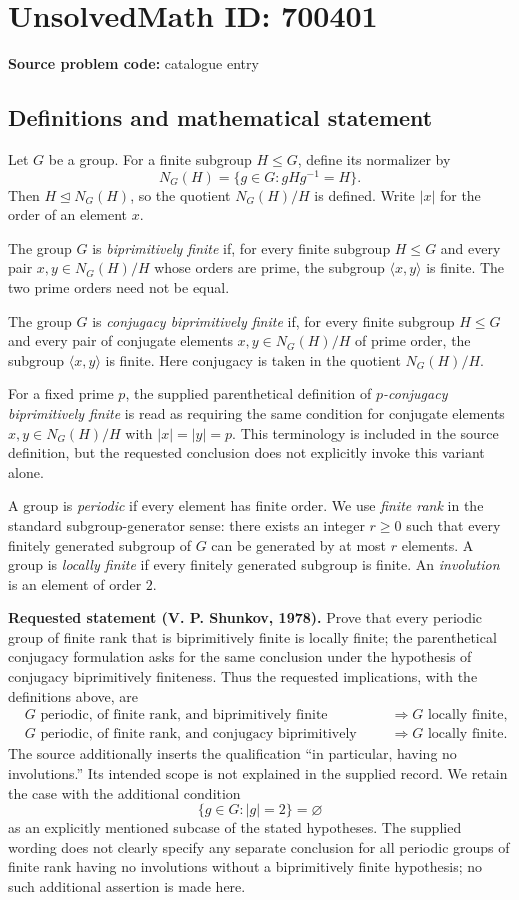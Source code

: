 \documentclass[11pt]{article}
\begin{document}
\section*{UnsolvedMath ID: 700401}
\textbf{Source problem code:} catalogue entry
\subsection{Definitions and mathematical statement}
Let \(G\) be a group. For a finite subgroup \(H\leq G\), define its normalizer by
\[
N_G(H)=\{g\in G:gHg^{-1}=H\}.
\]
Then \(H\trianglelefteq N_G(H)\), so the quotient \(N_G(H)/H\) is defined. Write \(|x|\) for the order of an element \(x\).

The group \(G\) is \emph{biprimitively finite} if, for every finite subgroup \(H\leq G\) and every pair \(x,y\in N_G(H)/H\) whose orders are prime, the subgroup \(\langle x,y\rangle\) is finite. The two prime orders need not be equal.

The group \(G\) is \emph{conjugacy biprimitively finite} if, for every finite subgroup \(H\leq G\) and every pair of conjugate elements \(x,y\in N_G(H)/H\) of prime order, the subgroup \(\langle x,y\rangle\) is finite. Here conjugacy is taken in the quotient \(N_G(H)/H\).

For a fixed prime \(p\), the supplied parenthetical definition of \emph{\(p\)-conjugacy biprimitively finite} is read as requiring the same condition for conjugate elements \(x,y\in N_G(H)/H\) with \(|x|=|y|=p\). This terminology is included in the source definition, but the requested conclusion does not explicitly invoke this variant alone.

A group is \emph{periodic} if every element has finite order. We use \emph{finite rank} in the standard subgroup-generator sense: there exists an integer \(r\geq 0\) such that every finitely generated subgroup of \(G\) can be generated by at most \(r\) elements. A group is \emph{locally finite} if every finitely generated subgroup is finite. An \emph{involution} is an element of order \(2\).

\textbf{Requested statement (V. P. Shunkov, 1978).} Prove that every periodic group of finite rank that is biprimitively finite is locally finite; the parenthetical conjugacy formulation asks for the same conclusion under the hypothesis of conjugacy biprimitively finiteness. Thus the requested implications, with the definitions above, are
\[
\begin{aligned}
&G\text{ periodic, of finite rank, and biprimitively finite}
&&\Longrightarrow G\text{ locally finite},\\
&G\text{ periodic, of finite rank, and conjugacy biprimitively finite}
&&\Longrightarrow G\text{ locally finite}.
\end{aligned}
\]
The source additionally inserts the qualification ``in particular, having no involutions.'' Its intended scope is not explained in the supplied record. We retain the case with the additional condition
\[
\{g\in G:|g|=2\}=\varnothing
\]
as an explicitly mentioned subcase of the stated hypotheses. The supplied wording does not clearly specify any separate conclusion for all periodic groups of finite rank having no involutions without a biprimitively finite hypothesis; no such additional assertion is made here.
\end{document}
